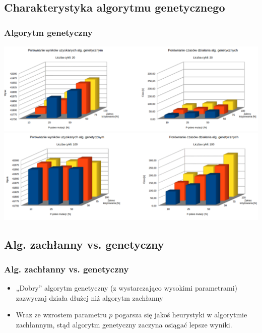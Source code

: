 \documentclass{beamer}
\begin{document}

\subsection{Charakterystyka algorytmu genetycznego}

\begin{frame}
\frametitle{Algorytm genetyczny}

\includegraphics[width=0.8\paperwidth]{pics/gen20.png} \\

\includegraphics[width=0.8\paperwidth]{pics/gen100.png}

\end{frame}


\subsection{Alg. zachłanny vs. genetyczny}

\begin{frame}
\frametitle{Alg. zachłanny vs. genetyczny}

\begin{itemize}

\item „Dobry” algorytm genetyczny (z wystarczająco wysokimi parametrami) zazwyczaj działa dłużej niż algorytm zachłanny
\item Wraz ze wzrostem parametru $p$ pogarsza się jakoś heurystyki w algorytmie zachłannym, stąd algorytm genetyczny zaczyna osiągać lepsze wyniki.

\end{itemize}

\end{frame}
\end{document}
